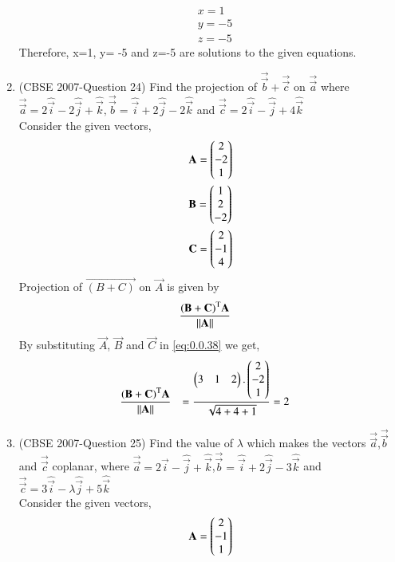 \documentclass[journal,12pt,twocolumn]{IEEEtran}
\begin{document}
\begin{enumerate}
\begin{align}
&x=1\\
&y= -5\\
&z=-5
\end{align}
Therefore, x=1, y= -5 and z=-5 are solutions to the given equations. 
\bigskip
\item (CBSE 2007-Question 24) Find the projection of $\overrightarrow{\vec{b}}+\overrightarrow{\vec{c}}$ on $\overrightarrow{\vec{a}}$ where $\overrightarrow{\vec{a}}=2\hat{\vec{i}}-2\hat{\vec{j}}+\hat{\vec{k}} , \overrightarrow{\vec{b}}=\hat{\vec{i}}+2\hat{\vec{j}}-2\hat{\vec{k}}$ and $ \overrightarrow{\vec{c}}=2\hat{\vec{i}}-\hat{\vec{j}}+4\hat{\vec{k}}$\\
\solution Consider the given vectors,
\begin{align}
&\vec{A}= \myvec{2\\-2\\1}\\
&\vec{B}=\myvec{1\\2\\-2}\\
&\vec{C}=\myvec{2\\-1\\4}
\end{align}
Projection of $\vec{(B+C)}$ on $\vec{A}$ is given by 
\begin{align}
&\displaystyle\frac{\vec{(B+C)}^\text T\vec{A}}{\|\vec{A}\|} \label{eq:0.0.38}
\end{align}
By substituting $\vec{A}$, $\vec{B}$ and $\vec{C} $ in \eqref{eq:0.0.38} we get, 
\begin{align}
  &\displaystyle\frac{\vec{(B+C)}^\text T\vec{A}}{\|\vec{A}\|}
&=\displaystyle\frac{\myvec{3&1&2}.\myvec{2\\-2\\1}}{\sqrt{4+4+1}} 
&=2 
\end{align}
\item (CBSE 2007-Question 25) Find the value of $\lambda$ which makes the vectors $\overrightarrow{\vec{a}}$,$\overrightarrow{\vec{b}}$ and $\overrightarrow{\vec{c}}$ coplanar, where $ \overrightarrow{\vec{a}}=2\hat{\vec{i}}-\hat{\vec{j}}+\hat{\vec{k}}$,$ \overrightarrow{\vec{b}}=\hat{\vec{i}}+2\hat{\vec{j}}-3\hat{\vec{k}}$ and $ \overrightarrow{\vec{c}}=3\hat{\vec{i}}-\lambda\hat{\vec{j}}+5\hat{\vec{k}}$\\
\solution Consider the given vectors,
\begin{align}
&\vec{A}= \myvec{2\\-1\\1}\\

\end{align}
\end{enumerate}
\end{document}
